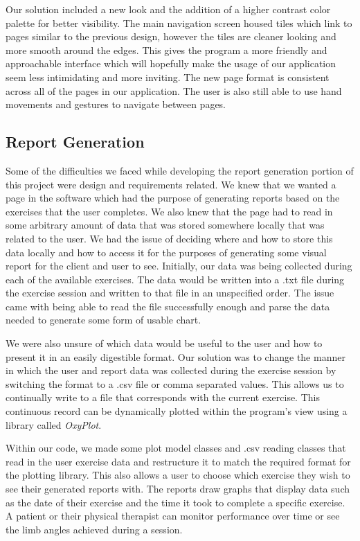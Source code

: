 \documentclass[onecolumn, draftclsnofoot,10pt, compsoc]{IEEEtran}
\begin{document}
Our solution included a new look and the addition of a higher contrast color palette for better visibility. The main navigation screen housed tiles which link to pages similar to the previous design, however the tiles are cleaner looking and more smooth around the edges. This gives the program a more friendly and approachable interface which will hopefully make the usage of our application seem less intimidating and more inviting. The new page format is consistent across all of the pages in our application. The user is also still able to use hand movements and gestures to navigate between pages.

\subsection{Report Generation}
Some of the difficulties we faced while developing the report generation portion of this project were design and requirements related. We knew that we wanted a page in the software which had the purpose of generating reports based on the exercises that the user completes. We also knew that the page had to read in some arbitrary amount of data that was stored somewhere locally that was related to the user. We had the issue of deciding where and how to store this data locally and how to access it for the purposes of generating some visual report for the client and user to see. Initially, our data was being collected during each of the available exercises. The data would be written into a .txt file during the exercise session and written to that file in an unspecified order. The issue came with being able to read the file successfully enough and parse the data needed to generate some form of usable chart. 

We were also unsure of which data would be useful to the user and how to present it in an easily digestible format. Our solution was to change the manner in which the user and report data was collected during the exercise session by switching the format to a .csv file or comma separated values. This allows us to continually write to a file that corresponds with the current exercise. This continuous record can be dynamically plotted within the program's view using a library called \textit{OxyPlot}\cite{OxyPlot}. 

Within our code, we made some plot model classes and .csv reading classes that read in the user exercise data and restructure it to match the required format for the plotting library. This also allows a user to choose which exercise they wish to see their generated reports with. The reports draw graphs that display data such as the date of their exercise and the time it took to complete a specific exercise. A patient or their physical therapist can monitor performance over time or see the limb angles achieved during a session.
\end{document}
